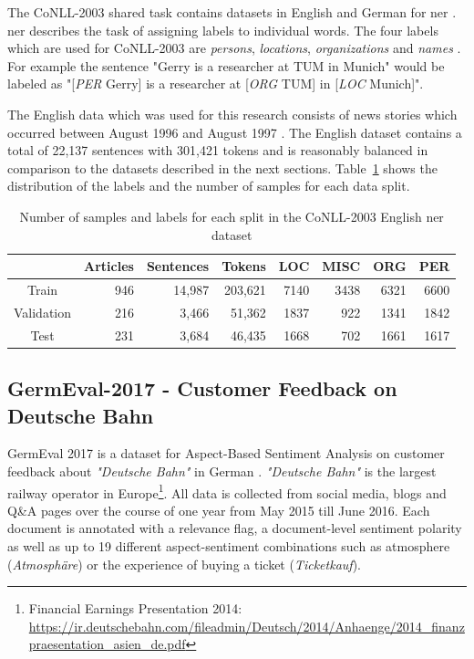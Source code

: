 The CoNLL-2003 shared task contains datasets in English and German for \acrfull{ner} \cite{Erik2003}. \gls{ner} describes the task of assigning labels to individual words. The four labels which are used for CoNLL-2003 are \textit{persons}, \textit{locations}, \textit{organizations} and \textit{names} \cite{Erik2003}. For example the sentence "Gerry is a researcher at TUM in Munich" would be labeled as "[\textit{PER} Gerry] is a researcher at [\textit{ORG} TUM] in [\textit{LOC} Munich]".
\medskip

The English data which was used for this research consists of news stories which occurred between August 1996 and August 1997 \cite{Erik2003}. The English dataset contains a total of 22,137 sentences with 301,421 tokens and is reasonably balanced in comparison to the datasets described in the next sections. Table~\ref{tab:05_conll2003DatasetStats} shows the distribution of the labels and the number of samples for each data split.

\begin{table}
	\centering
	\begin{tabular}{crrrrrrr}
		\toprule
		& Articles & Sentences & Tokens & LOC & MISC & ORG & PER \\ 
		\midrule
		Train & 946 & 14,987 & 203,621 & 7140 & 3438 & 6321 & 6600 \\ 
		Validation & 216 & 3,466 & 51,362 & 1837 & 922 & 1341 & 1842 \\ 
		Test & 231 & 3,684 & 46,435 & 1668 & 702 & 1661 & 1617 \\ 
		\bottomrule 
	\end{tabular} 
\caption{Number of samples and labels for each split in the CoNLL-2003 English \gls{ner} dataset}
\label{tab:05_conll2003DatasetStats}
\end{table}


\subsection{GermEval-2017 - Customer Feedback on Deutsche Bahn}
\label{sec:05_germeval}
GermEval 2017 is a dataset for Aspect-Based Sentiment Analysis on customer feedback about \textit{"Deutsche Bahn"} in German \cite{Wojatzki2017}. \textit{"Deutsche Bahn"} is the largest railway operator in Europe\footnote{Financial Earnings Presentation 2014: \url{https://ir.deutschebahn.com/fileadmin/Deutsch/2014/Anhaenge/2014_finanzpraesentation_asien_de.pdf}}. All data is collected from social media, blogs and Q\&A pages over the course of one year from May 2015 till June 2016. Each document is annotated with a relevance flag, a document-level sentiment polarity as well as up to 19 different aspect-sentiment combinations such as atmosphere {(\textit{Atmosphäre})} or the experience of buying a ticket {(\textit{Ticketkauf})}.
\medskip


